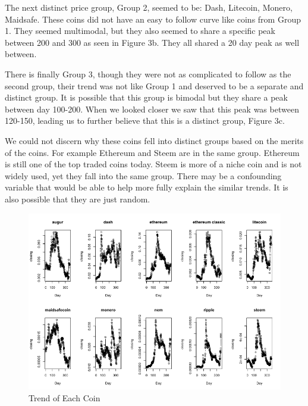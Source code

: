 \documentclass[12pt]{article}
\begin{document}
\indent The next distinct price group, Group 2, seemed to be: Dash, Litecoin, Monero, Maidsafe. These coins did not have an easy to follow curve like coins from Group 1. They seemed multimodal, but they also seemed to share a specific peak between 200 and 300 as seen in Figure 3b. They all shared a 20 day peak as well between.

\indent There is finally Group 3, though they were not as complicated to follow as the second group, their trend was not like Group 1 and deserved to be a separate and distinct group. It is possible that this group is bimodal but they share a peak between day 100-200. When we looked closer we saw that this peak was between 120-150, leading us to further believe that this is a distinct group, Figure 3c.

\indent We could not discern why these coins fell into distinct groups based on the merits of the coins. For example Ethereum and Steem are in the same group. Ethereum is still one of the top traded coins today. Steem is more of a niche coin and is not widely used, yet they fall into the same group. There may be a confounding variable that would be able to help more fully explain the similar trends. It is also possible that they are just random.

\begin{figure}

\centering
  \includegraphics[width=\linewidth]{images/AllCoinTrends1.png}
 \caption{Trend of Each Coin}
\label{label}

\end{figure}
\end{document}
